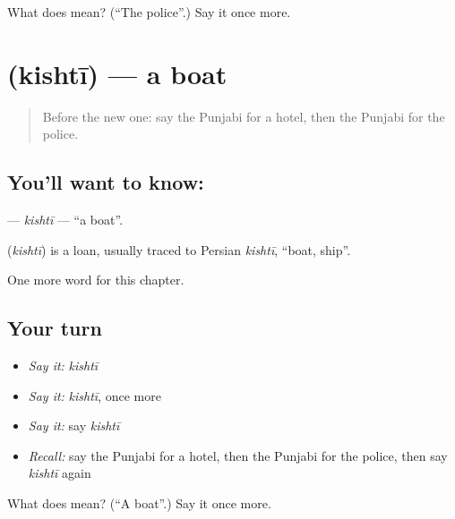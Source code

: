 \begin{tcolorbox}[breakable,colback=teal!4,colframe=teal!35!black,title={Before you move on}]
What does  mean? (\textquotedblleft{}The police\textquotedblright{}.) Say it once more.
\end{tcolorbox}
\section[\texorpdfstring{\pa{ਕਿਸ਼ਤੀ} (kishtī)}{ਕਿਸ਼ਤੀ (kishtī)}]{ (kishtī) — a boat}

\label{lesson:PA-C92-kishti}



\begin{quote}
Before the new one: say the Punjabi for a hotel, then the Punjabi for the police.
\end{quote}

\subsection*{You'll want to know: }
\textbf{} — \emph{kishtī} — \textquotedblleft{}a boat\textquotedblright{}.

\begin{cousinweb}
\textbf{} (\emph{kishtī}) is a loan, usually traced to Persian \emph{kishtī}, \textquotedblleft{}boat, ship\textquotedblright{}.
\end{cousinweb}

\begin{grammarlens}[title={What you've built}]
One more word for this chapter.
\end{grammarlens}

\subsection*{Your turn}
\begin{itemize}
\raggedright
  \item \emph{Say it:} \emph{kishtī}
  \item \emph{Say it:} \emph{kishtī}, once more
  \item \emph{Say it:} say \emph{kishtī}
  \item \emph{Recall:} say the Punjabi for a hotel, then the Punjabi for the police, then say \emph{kishtī} again
\end{itemize}

\begin{tcolorbox}[breakable,colback=teal!4,colframe=teal!35!black,title={Before you move on}]
What does  mean? (\textquotedblleft{}A boat\textquotedblright{}.) Say it once more.
\end{tcolorbox}
